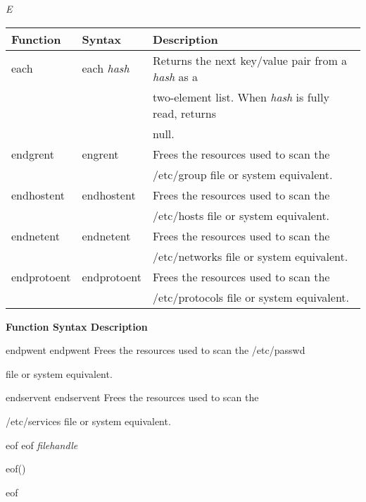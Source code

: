 \documentclass[a4paper,11pt]{book}
\begin{document}
\noindent 

\noindent \textit{E}

\begin{tabular}{|p{1.1in}|p{0.9in}|p{2.2in}|} \hline 
\textbf{Function} & \textbf{Syntax} & \textbf{Description} \\ \hline 
each & each \textit{hash} & Returns the next key/value pair from a \textit{hash }as a \\ \hline 
 &  & two-element list. When \textit{hash }is fully read, returns \\ \hline 
 &  & null. \\ \hline 
endgrent & engrent & Frees the resources used to scan the \\ \hline 
 &  & /etc/group file or system equivalent. \\ \hline 
endhostent & endhostent & Frees the resources used to scan the \\ \hline 
 &  & /etc/hosts file or system equivalent. \\ \hline 
endnetent & endnetent & Frees the resources used to scan the \\ \hline 
 &  & /etc/networks file or system equivalent. \\ \hline 
endprotoent & endprotoent & Frees the resources used to scan the \\ \hline 
 &  & /etc/protocols file or system equivalent. \\ \hline 
\end{tabular}



\noindent 

\noindent \textbf{Function Syntax Description}

\noindent 

\noindent endpwent endpwent Frees the resources used to scan the /etc/passwd

\noindent file or system equivalent.

\noindent 

\noindent endservent endservent Frees the resources used to scan the

\noindent /etc/services file or system equivalent.

\noindent 

\noindent eof eof \textit{filehandle}

\noindent eof()

\noindent eof

\noindent 

\noindent 

\noindent 
\end{document}
